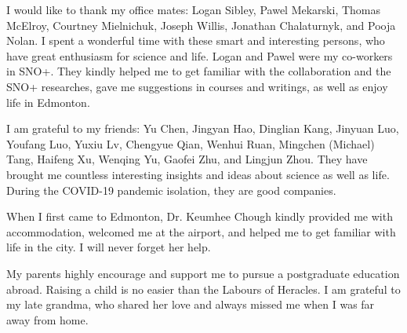 I would like to thank my office mates: Logan Sibley, Pawel Mekarski, Thomas McElroy, Courtney Mielnichuk, Joseph Willis, Jonathan Chalaturnyk, and Pooja Nolan. I spent a wonderful time with these smart and interesting persons, who have great enthusiasm for science and life. Logan and Pawel were my co-workers in SNO+. They kindly helped me to get familiar with the collaboration and the SNO+ researches, gave me suggestions in courses and writings, as well as enjoy life in Edmonton.

I am grateful to my friends: Yu Chen, Jingyan Hao, Dinglian Kang, Jinyuan Luo, Youfang Luo, Yuxiu Lv, Chengyue Qian, Wenhui Ruan, Mingchen (Michael) Tang, Haifeng Xu, Wenqing Yu, Gaofei Zhu, and Lingjun Zhou. They have brought me countless interesting insights and ideas about science as well as life. During the COVID-19 pandemic isolation, they are good companies.

When I first came to Edmonton, Dr. Keumhee Chough kindly provided me with accommodation, welcomed me at the airport, and helped me to get familiar with life in the city. I will never forget her help.

My parents highly encourage and support me to pursue a postgraduate education abroad. Raising a child is no easier than the Labours of Heracles. I am grateful to my late grandma, who shared her love and always missed me when I was far away from home.